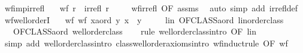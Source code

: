 \begin{isabellebody}
\endisatagproof
{\isafoldproof}%
%
\isadelimproof
\isanewline
%
\endisadelimproof
\isanewline
{}\isamarkupfalse%
\ wf{\isacharunderscore}{\kern0pt}imp{\isacharunderscore}{\kern0pt}irrefl{\isacharcolon}{\kern0pt}\isanewline
\ \ \ {\isachardoublequoteopen}wf\ r{\isachardoublequoteclose}\ \ {\isachardoublequoteopen}irrefl\ r{\isachardoublequoteclose}\ \isanewline
%
\isadelimproof
\ \ %
\endisadelimproof
%
\isatagproof
{}\isamarkupfalse%
\ wf{\isacharunderscore}{\kern0pt}irrefl\ {\isacharbrackleft}{\kern0pt}OF\ assms{\isacharbrackright}{\kern0pt}\ \isamarkupfalse%
\ {\isacharparenleft}{\kern0pt}auto\ simp\ add{\isacharcolon}{\kern0pt}\ irrefl{\isacharunderscore}{\kern0pt}def{\isacharparenright}{\kern0pt}%
\endisatagproof
{\isafoldproof}%
%
\isadelimproof
\isanewline
%
\endisadelimproof
\isanewline
{}\isamarkupfalse%
\ wf{\isacharunderscore}{\kern0pt}wellorderI{\isacharcolon}{\kern0pt}\isanewline
\ \ \ wf{\isacharcolon}{\kern0pt}\ {\isachardoublequoteopen}wf\ {\isacharbraceleft}{\kern0pt}{\isacharparenleft}{\kern0pt}x{\isacharcolon}{\kern0pt}{\isacharcolon}{\kern0pt}{\isacharprime}{\kern0pt}a{\isacharcolon}{\kern0pt}{\isacharcolon}{\kern0pt}ord{\isacharcomma}{\kern0pt}\ y{\isacharparenright}{\kern0pt}{\isachardot}{\kern0pt}\ x\ {\isacharless}{\kern0pt}\ y{\isacharbraceright}{\kern0pt}{\isachardoublequoteclose}\isanewline
\ \ \ \ \ lin{\isacharcolon}{\kern0pt}\ {\isachardoublequoteopen}OFCLASS{\isacharparenleft}{\kern0pt}{\isacharprime}{\kern0pt}a{\isacharcolon}{\kern0pt}{\isacharcolon}{\kern0pt}ord{\isacharcomma}{\kern0pt}\ linorder{\isacharunderscore}{\kern0pt}class{\isacharparenright}{\kern0pt}{\isachardoublequoteclose}\isanewline
\ \ \ {\isachardoublequoteopen}OFCLASS{\isacharparenleft}{\kern0pt}{\isacharprime}{\kern0pt}a{\isacharcolon}{\kern0pt}{\isacharcolon}{\kern0pt}ord{\isacharcomma}{\kern0pt}\ wellorder{\isacharunderscore}{\kern0pt}class{\isacharparenright}{\kern0pt}{\isachardoublequoteclose}\isanewline
%
\isadelimproof
\ \ %
\endisadelimproof
%
\isatagproof
{}\isamarkupfalse%
\ {\isacharparenleft}{\kern0pt}rule\ wellorder{\isacharunderscore}{\kern0pt}class{\isachardot}{\kern0pt}intro\ {\isacharbrackleft}{\kern0pt}OF\ lin{\isacharbrackright}{\kern0pt}{\isacharparenright}{\kern0pt}\isanewline
\ \ \isamarkupfalse%
\ {\isacharparenleft}{\kern0pt}simp\ add{\isacharcolon}{\kern0pt}\ wellorder{\isacharunderscore}{\kern0pt}class{\isachardot}{\kern0pt}intro\ class{\isachardot}{\kern0pt}wellorder{\isacharunderscore}{\kern0pt}axioms{\isachardot}{\kern0pt}intro\ wf{\isacharunderscore}{\kern0pt}induct{\isacharunderscore}{\kern0pt}rule\ {\isacharbrackleft}{\kern0pt}OF\ wf{\isacharbrackright}{\kern0pt}{\isacharparenright}{\kern0pt}\isanewline

\end{isabellebody}
